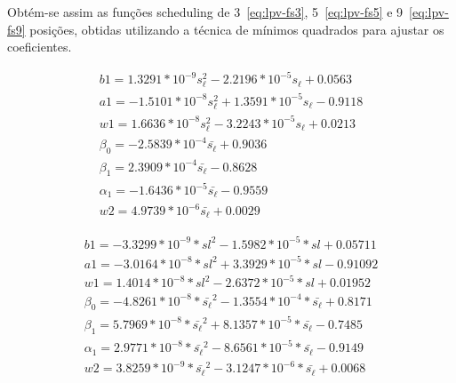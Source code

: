 Obtém-se assim as funções scheduling de 3~\eqref{eq:lpv-fs3},
5~\eqref{eq:lpv-fs5} e 9~\eqref{eq:lpv-fs9} posições, obtidas utilizando a
técnica de mínimos quadrados para ajustar os coeficientes.

\begin{equation}
	\label{eq:lpv-fs3}
	\begin{split}
		b1 = 1.3291*10^{-9} s_\ell^2 - 2.2196*10^{-5} s_\ell + 0.0563  \\
		a1 = -1.5101*10^{-8} s_\ell^2 + 1.3591*10^{-5} s_\ell - 0.9118 \\
		w1 = 1.6636*10^{-8} s_\ell^2 - 3.2243*10^{-5} s_\ell + 0.0213  \\
		\beta_0 = -2.5839*10^{-4} \bar{s_\ell} + 0.9036                \\
		\beta_1 = 2.3909*10^{-4} \bar{s_\ell} - 0.8628                 \\
		\alpha_1 = -1.6436*10^{-5} \bar{s_\ell} - 0.9559               \\
		w2 = 4.9739*10^{-6} \bar{s_\ell} + 0.0029
	\end{split}
\end{equation}

\begin{equation}
	\label{eq:lpv-fs5}
	\begin{split}
		b1 = -3.3299*10^{-9} * sl^2 - 1.5982*10^{-5} * sl + 0.05711                         \\
		a1 = -3.0164*10^{-8} * sl^2 + 3.3929*10^{-5} * sl - 0.91092                         \\
		w1 = 1.4014*10^{-8} * sl^2 - 2.6372*10^{-5} * sl + 0.01952                          \\
		\beta_0 = -4.8261*10^{-8} * \bar{s_\ell}^2 - 1.3554*10^{-4} * \bar{s_\ell} + 0.8171 \\
		\beta_1 = 5.7969*10^{-8} * \bar{s_\ell}^2 + 8.1357*10^{-5} * \bar{s_\ell} - 0.7485  \\
		\alpha_1 = 2.9771*10^{-8} * \bar{s_\ell}^2 - 8.6561*10^{-5} * \bar{s_\ell} - 0.9149 \\
		w2 = 3.8259*10^{-9} * \bar{s_\ell}^2 - 3.1247*10^{-6} * \bar{s_\ell} + 0.0068
	\end{split}
\end{equation}

